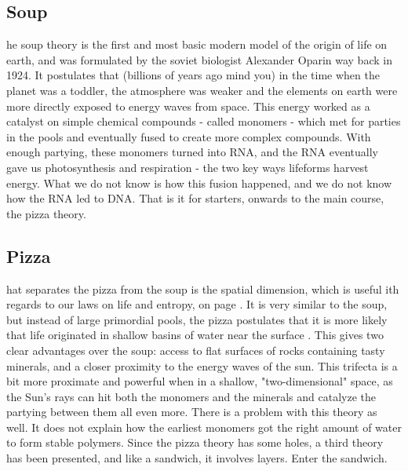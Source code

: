 \subsection{Soup}
he soup theory is the first and most basic modern model of the origin of life on earth, and was formulated by the soviet biologist Alexander Oparin way back in 1924.
It postulates \cite{shapiro} that (billions of years ago mind you) in the time when the planet was a toddler, the atmosphere was weaker and the elements on earth were more directly exposed to energy waves from space.
This energy worked as a catalyst on simple chemical compounds - called monomers - which met for parties in the pools and eventually fused to create more complex compounds.
With enough partying, these monomers turned into RNA, and the RNA eventually gave us photosynthesis and respiration - the two key ways lifeforms harvest energy.
What we do not know is how this fusion happened, and we do not know how the RNA led to DNA. 
That is it for starters, onwards to the main course, the pizza theory.

\subsection{Pizza}
hat separates the pizza from the soup is the spatial dimension, which is useful ith regards to our laws on life and entropy, on page \pageref{entropylol}.
It is very similar to the soup, but instead of large primordial pools, the pizza postulates that it is more likely that life originated in shallow basins of water near the surface \cite{Exoboken}. 
This gives two clear advantages over the soup: access to flat surfaces of rocks containing tasty minerals, and a closer proximity to the energy waves of the sun.
This trifecta is a bit more proximate and powerful when in a shallow, "two-dimensional" space, as the Sun’s rays can hit both the monomers and the minerals and catalyze the partying between them all even more.
There is a problem with this theory as well.
It does not explain how the earliest monomers got the right amount of water to form stable polymers.
Since the pizza theory has some holes, a third theory has been presented, and like a sandwich, it involves layers.
Enter the sandwich.

